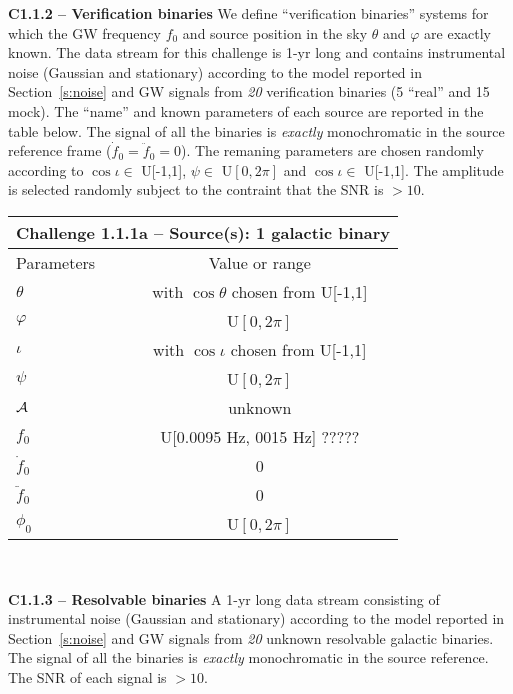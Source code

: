 \documentclass[11pt]{report}
\begin{document}
\begin{description}
\item {\bf C1.1.2 -- Verification binaries} We define ``verification binaries'' systems for which the GW frequency $f_0$ and source position in the sky $\theta$ and $\varphi$ are exactly known. The data stream for this challenge is 1-yr long and contains instrumental noise (Gaussian and stationary) according to the model reported in Section~\ref{s:noise} and GW signals from {\em 20} verification binaries (5 ``real'' and 15 mock). The ``name'' and known parameters of each source are reported in the table below. The signal of all the binaries is {\em exactly} monochromatic in the source reference frame ($\dot{f}_0 = \ddot{f}_0 = 0$). The remaning parameters are chosen randomly according to $\cos\iota\in$ U[-1,1], $\psi \in$ U$[0,2\pi]$ and $\cos\iota\in$ U[-1,1]. The amplitude is selected randomly subject to the contraint that the SNR is $> 10$.

\begin{center}
\begin{tabular}{l|c}
\hline \hline
\multicolumn{2}{c}{{\bf Challenge 1.1.1a -- Source(s): 1 galactic binary}} \\
\hline
Parameters & Value or range \\
\hline
$\theta$          & with $\cos\theta$ chosen from U[-1,1]\\
$\varphi$         & U$[0,2\pi]$ \\ 
$\iota$           & with $\cos\iota$ chosen from U[-1,1]\\ 
$\psi$            & U$[0,2\pi]$ \\
${\cal A}$        & unknown \\
$f_0$             & U[0.0095 Hz, 0015 Hz] ?????\\ 
$\dot{f}_0$       & 0 \\ 
$\ddot{f}_0$      & 0\\ 
$\phi_0$          & U$[0,2\pi]$ \\
\hline \hline
\end{tabular} \\
\end{center}

\item {\bf C1.1.3 -- Resolvable binaries} A 1-yr long data stream consisting of instrumental noise (Gaussian and stationary) according to the model reported in Section~\ref{s:noise} and GW signals from {\em 20} unknown resolvable galactic binaries. The signal of all the binaries is {\em exactly} monochromatic in the source reference. The SNR of each signal is $> 10$.


\end{description}
\end{document}
